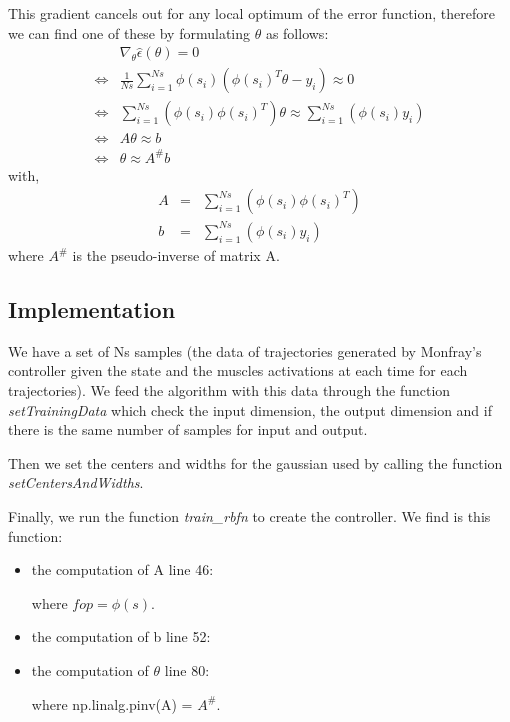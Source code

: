 \documentclass[pdftex,a4paper,11pt]{report}
\begin{document}
This gradient cancels out for any local optimum of the error function, therefore we can find one of these by formulating $\theta$ as follows:
\begin{eqnarray}
 & \nabla_\theta\hat{\epsilon}(\theta) = 0 \nonumber \\
\Leftrightarrow & \frac{1}{Ns}\sum\limits_{i=1}^{Ns}\phi(s_i)(\phi(s_i)^T\mathbb{\theta} - y_i) \approx 0 \nonumber \\
\Leftrightarrow & \sum\limits_{i=1}^{Ns}(\phi(s_i)\phi(s_i)^T)\mathbb{\theta} \approx \sum\limits_{i=1}^{Ns}(\phi(s_i)y_i) \nonumber \\
\Leftrightarrow & A\mathbb{\theta} \approx b \nonumber \\
\Leftrightarrow & \mathbb{\theta} \approx A^\#b \nonumber
\end{eqnarray}
with,
\begin{eqnarray}
A & = & \sum\limits_{i=1}^{Ns}(\phi(s_i)\phi(s_i)^T) \\
b & = & \sum\limits_{i=1}^{Ns}(\phi(s_i)y_i)
\end{eqnarray}
where $A^\#$ is the pseudo-inverse of matrix A.

\subsection{Implementation}
We have a set of Ns samples (the data of trajectories generated by Monfray's controller given the state and the muscles activations at each time for each trajectories). We feed the algorithm with this data through the function \textit{setTrainingData} which check the input dimension, the output dimension and if there is the same number of samples for input and output.

Then we set the centers and widths for the gaussian used by calling the function \textit{setCentersAndWidths}.

Finally, we run the function \textit{train\_rbfn} to create the controller. We find is this function:
\begin{itemize}
\item the computation of A line 46:

where $fop = \phi(s)$.
\item the computation of b line 52:

\item the computation of $\theta$ line 80:

where np.linalg.pinv(A) = $A^\#$.
\end{itemize}
 
\end{document}
